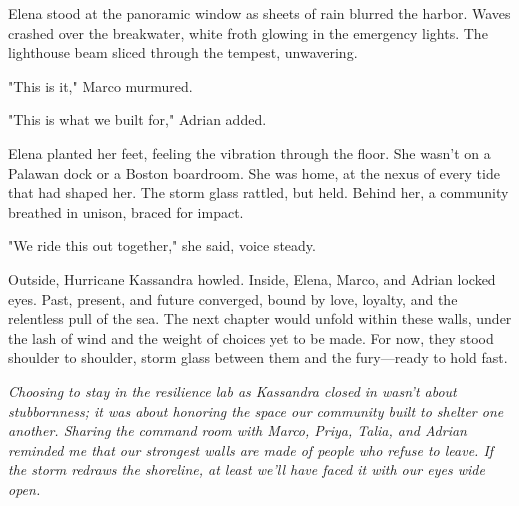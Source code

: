 Elena stood at the panoramic window as sheets of rain blurred the harbor. Waves crashed over the breakwater, white froth glowing in the emergency lights. The lighthouse beam sliced through the tempest, unwavering.

"This is it," Marco murmured.

"This is what we built for," Adrian added.

Elena planted her feet, feeling the vibration through the floor. She wasn't on a Palawan dock or a Boston boardroom. She was home, at the nexus of every tide that had shaped her. The storm glass rattled, but held. Behind her, a community breathed in unison, braced for impact.

"We ride this out together," she said, voice steady.

Outside, Hurricane Kassandra howled. Inside, Elena, Marco, and Adrian locked eyes. Past, present, and future converged, bound by love, loyalty, and the relentless pull of the sea. The next chapter would unfold within these walls, under the lash of wind and the weight of choices yet to be made. For now, they stood shoulder to shoulder, storm glass between them and the fury—ready to hold fast.


\noindent\textit{Choosing to stay in the resilience lab as Kassandra closed in wasn't about stubbornness; it was about honoring the space our community built to shelter one another. Sharing the command room with Marco, Priya, Talia, and Adrian reminded me that our strongest walls are made of people who refuse to leave. If the storm redraws the shoreline, at least we'll have faced it with our eyes wide open.}
